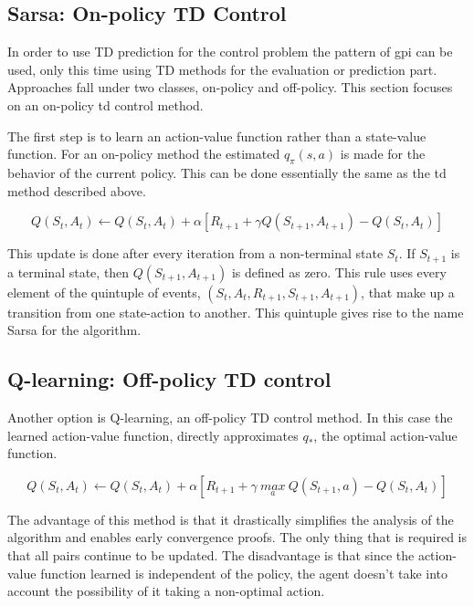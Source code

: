 \subsection{Sarsa: On-policy TD Control}
In order to use TD prediction for the control problem the pattern of \acrfull{gpi} can be used, only this time using TD methods for the evaluation or prediction part. Approaches fall under two classes, on-policy and off-policy. This section focuses on an on-policy \gls{td} control method.

The first step is to learn an action-value function rather than a state-value function. For an on-policy method the estimated $q_\pi(s,a)$ is made for the behavior of the current policy. This can be done essentially the same as the \gls{td} method described above.

\begin{equation}
  Q(S_t, A_t) \leftarrow Q(S_t, A_t) + \alpha \left [  R_{t+1} + \gamma Q(S_{t+1}, A_{t+1})- Q(S_t, A_t) \right ]
\end{equation}

This update is done after every iteration from a non-terminal state $S_t$. If $S_{t+1}$ is a terminal state, then $Q(S_{t+1}, A_{t+1})$ is defined as zero. This rule uses every element of the quintuple of events, $(S_t, A_t, R_{t+1}, S_{t+1}, A_{t+1})$, that make up a transition from one state-action to another. This quintuple gives rise to the name Sarsa for the algorithm.


\subsection{Q-learning: Off-policy TD control}
Another option is Q-learning, an off-policy TD control method. In this case the learned action-value function, directly approximates $q_*$, the optimal action-value function.

\begin{equation}
  Q(S_t, A_t) \leftarrow Q(S_t, A_t) + \alpha \left [  R_{t+1} + \gamma\ \underset{a}{max}\ Q(S_{t+1}, a) - Q(S_t, A_t) \right ]
\end{equation}

The advantage of this method is that it drastically simplifies the analysis of the algorithm and enables early convergence proofs. The only thing that is required is that all pairs continue to be updated.
The disadvantage is that since the action-value function learned is independent of the policy, the agent doesn't take into account the possibility of it taking a non-optimal action.

